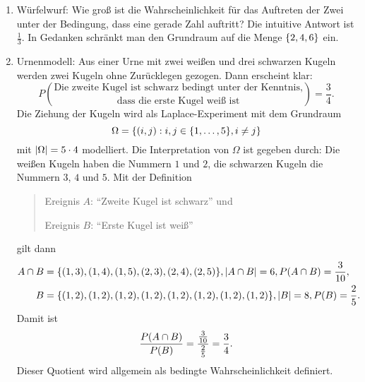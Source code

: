 \documentclass{lecture}
\begin{document}
    \begin{example}
        \begin{enumerate}
            \item Würfelwurf: Wie groß ist die Wahrscheinlichkeit für das Auftreten der Zwei unter der Bedingung, dass eine gerade Zahl auftritt?
            Die intuitive Antwort ist \(\frac{1}{3}\).
            In Gedanken schränkt man den Grundraum auf die Menge \(\braces*{2, 4, 6}\) ein.
            \item Urnenmodell: Aus einer Urne mit zwei weißen und drei schwarzen Kugeln werden zwei Kugeln ohne Zurücklegen gezogen.
            Dann erscheint klar:
            \[
                P\binom{\text{Die zweite Kugel ist schwarz bedingt unter der Kenntnis,}}{\text{dass die erste Kugel weiß ist}} = \frac{3}{4}.
            \]
            Die Ziehung der Kugeln wird als Laplace-Experiment mit dem Grundraum
            \[
                \Omega = \braces*{\parentheses*{i, j} : i, j \in \braces*{1, \ldots, 5}, i \ne j}
            \]
            mit \(\absolute*{\Omega} = 5 \cdot 4\) modelliert.
            Die Interpretation von \(\Omega\) ist gegeben durch: Die weißen Kugeln haben die Nummern \(1\) und \(2\), die schwarzen Kugeln die Nummern \(3\), \(4\) und \(5\).
            Mit der Definition
            \begin{quote}
                Ereignis \(A\): ``Zweite Kugel ist schwarz'' und

                Ereignis \(B\): ``Erste Kugel ist weiß''
            \end{quote}
            gilt dann
            \begin{align*}
                A \cap B &= \braces*{\parentheses*{1, 3}, \parentheses*{1, 4}, \parentheses*{1, 5}, \parentheses*{2, 3}, \parentheses*{2, 4}, \parentheses*{2, 5}}, \absolute*{A \cap B} = 6, P\parentheses*{A \cap B} = \frac{3}{10},\\
                B &= \braces*{\parentheses*{1, 2}, \parentheses*{1, 2}, \parentheses*{1, 2}, \parentheses*{1, 2}, \parentheses*{1, 2}, \parentheses*{1, 2}, \parentheses*{1, 2}, \parentheses*{1, 2}}, \absolute*{B} = 8, P\parentheses*{B} = \frac{2}{5}.
            \end{align*}
            Damit ist
            \[
                \frac{P\parentheses*{A \cap B}}{P\parentheses*{B}} = \frac{\frac{3}{10}}{\frac{2}{5}} = \frac{3}{4}.
            \]
            Dieser Quotient wird allgemein als bedingte Wahrscheinlichkeit definiert.
        \end{enumerate}
    \end{example}
\end{document}
